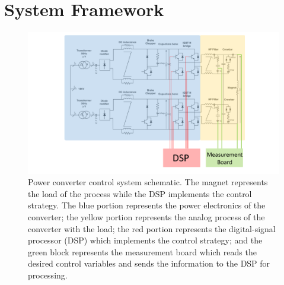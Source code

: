 \documentclass[a4paper, 10pt, conference]{ieeeconf}
\begin{document}
\section{System Framework}
\label{sec:system}
\begin{figure}
\centering
\includegraphics[width=1.7\columnwidth]{../pics/voltage_loop_schematic_color_coded}
\caption{Power converter control system schematic. The magnet represents the load of the process while the DSP implements the control strategy. The blue portion represents the power electronics of the converter; the yellow portion represents the analog process of the converter with the load; the red portion represents the digital-signal processor (DSP) which implements the control strategy; and the green block represents the measurement board which reads the desired control variables and sends the information to the DSP for processing.}
\label{fig:circuit}
\end{figure}
\end{document}
